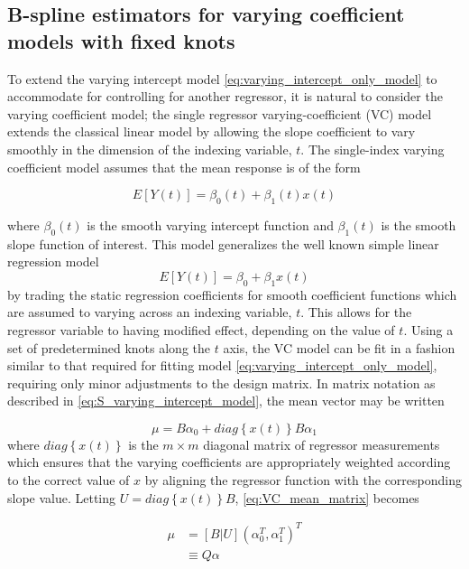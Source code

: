\documentclass[12pt]{article}
\theoremstyle{definition}
\begin{document}
\subsection{B-spline estimators for varying coefficient models with fixed knots}

To extend the varying intercept model \ref{eq:varying_intercept_only_model} to accommodate for controlling for another regressor, it is natural to consider the varying coefficient model; the single regressor varying-coefficient (VC) model extends the classical linear model by allowing the slope coefficient to vary smoothly in the dimension of the indexing variable, $t$.  The single-index varying coefficient model assumes that the mean response is of the form

\begin{equation} \label{eq:simplest_VC_model_mean}
E\left[ Y\left(t\right) \right] = \beta_0\left(t\right) + \beta_1\left(t\right)x\left(t\right)
\end{equation}

where $\beta_0\left(t\right)$ is the smooth varying intercept function and $\beta_1\left(t\right)$ is the smooth slope function of interest. This model generalizes the well known simple linear regression model 
\[
E\left[Y\left(t\right)\right] = \beta_0 + \beta_1 x\left(t\right)
\]
by trading the static regression coefficients for smooth coefficient functions which are assumed to varying across an indexing variable, $t$. This allows for the regressor variable to having modified effect, depending on the value of $t$. Using a set of predetermined knots along the $t$ axis, the VC model can be fit in a fashion similar to that required for fitting model \ref{eq:varying_intercept_only_model}, requiring only minor adjustments to the design matrix. In matrix notation as described in \ref{eq:S_varying_intercept_model}, the mean vector may be written

\begin{equation} \label{eq:VC_mean_matrix}
\mu = B\alpha_0 + diag\left\{x\left(t\right) \right\}B\alpha_1
\end{equation} 
\noindent
where $diag\left\{x\left(t\right) \right\}$ is the $m \times m$ diagonal matrix of regressor measurements which ensures that the varying coefficients are appropriately weighted according to the correct value of $x$ by aligning the regressor function with the corresponding slope value. Letting $U = diag\left\{x\left(t\right) \right\}B$, \ref{eq:VC_mean_matrix} becomes

\begin{align}
\mu &= \left[ B | U \right] \left(\alpha_0^T,\alpha_1^T\right)^T \\
&\equiv Q\alpha
\end{align} 
\end{document}
